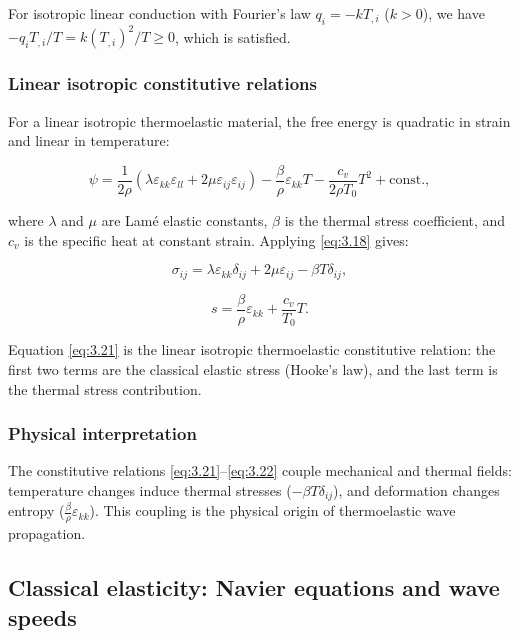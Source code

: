 For isotropic linear conduction with Fourier's law $q_i = -k T_{,i}$ ($k > 0$), we have $-q_i T_{,i}/T = k(T_{,i})^2/T \geq 0$, which is satisfied.

\subsubsection{Linear isotropic constitutive relations}

For a linear isotropic thermoelastic material, the free energy is quadratic in strain and linear in temperature:

\begin{equation}
\psi = \frac{1}{2\rho}(\lambda \varepsilon_{kk}\varepsilon_{ll} + 2\mu \varepsilon_{ij}\varepsilon_{ij})
- \frac{\beta}{\rho}\varepsilon_{kk} T - \frac{c_v}{2\rho T_0}T^2 + \text{const.},
\label{eq:3.20}
\end{equation}

where $\lambda$ and $\mu$ are Lamé elastic constants, $\beta$ is the thermal stress coefficient, and $c_v$ is the specific heat at constant strain. Applying \eqref{eq:3.18} gives:

\begin{equation}
\sigma_{ij} = \lambda \varepsilon_{kk}\delta_{ij} + 2\mu\varepsilon_{ij} - \beta T\delta_{ij},
\label{eq:3.21}
\end{equation}

\begin{equation}
s = \frac{\beta}{\rho}\varepsilon_{kk} + \frac{c_v}{T_0}T.
\label{eq:3.22}
\end{equation}

Equation \eqref{eq:3.21} is the linear isotropic thermoelastic constitutive relation: the first two terms are the classical elastic stress (Hooke's law), and the last term is the thermal stress contribution.

\subsubsection{Physical interpretation}
The constitutive relations \eqref{eq:3.21}--\eqref{eq:3.22} couple mechanical and thermal fields: temperature changes induce thermal stresses ($-\beta T\delta_{ij}$), and deformation changes entropy ($\frac{\beta}{\rho}\varepsilon_{kk}$). This coupling is the physical origin of thermoelastic wave propagation.

\subsection{Classical elasticity: Navier equations and wave speeds}
\label{sec:3.6}

